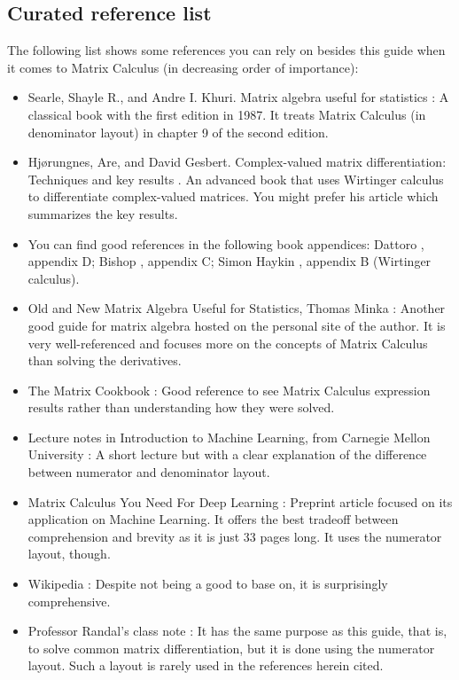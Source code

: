 \documentclass{article}
\begin{document}
\subsection{Curated reference list}
The following list shows some references you can rely on besides this guide when it comes to Matrix Calculus (in decreasing order of importance):
\begin{itemize}
    \item Searle, Shayle R., and Andre I. Khuri. Matrix algebra useful for statistics \cite{searle2017matrix}: A classical book with the first edition in 1987. It treats Matrix Calculus (in denominator layout) in chapter 9 of the second edition.
    \item Hj\o rungnes, Are, and David Gesbert. Complex-valued matrix differentiation: Techniques and key results \cite{hjorungnes2011complex}. An advanced book that uses Wirtinger calculus to differentiate complex-valued matrices. You might prefer his article \cite{hjorungnes2007complex} which summarizes the key results.
    \item You can find good references in the following book appendices: Dattoro \cite{dattorroConvexOptimizationEuclidean2010}, appendix D; Bishop \cite{bishopPatternRecognitionMachine2006}, appendix C; Simon Haykin \cite{haykin2009neural}, appendix B (Wirtinger calculus).
    \item Old and New Matrix Algebra Useful for Statistics, Thomas Minka \cite{ThomasMinka}: Another good guide for matrix algebra hosted on the personal site of the author. It is very well-referenced and focuses more on the concepts of Matrix Calculus than solving the derivatives.
    \item The Matrix Cookbook \cite{petersen2008matrix}: Good reference to see Matrix Calculus expression results rather than understanding how they were solved.
    \item Lecture notes in Introduction to Machine Learning, from Carnegie Mellon University \cite{Singh}: A short lecture but with a clear explanation of the difference between numerator and denominator layout.
    \item Matrix Calculus You Need For Deep Learning \cite{parrMatrixCalculusYou2018}: Preprint article focused on its application on Machine Learning. It offers the best tradeoff between comprehension and brevity as it is just 33 pages long. It uses the numerator layout, though.
    \item Wikipedia \cite{Matrixca44:online}: Despite not being a good to base on, it is surprisingly comprehensive.
    \item Professor Randal's class note \cite{barnes2006matrix}: It has the same purpose as this guide, that is, to solve common matrix differentiation, but it is done using the numerator layout. Such a layout is rarely used in the references herein cited.
\end{itemize}
\end{document}
